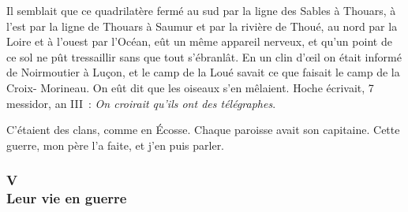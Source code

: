 \documentclass[french,twoside]{book} %
\begin{document}
Il semblait que ce quadrilatère fermé au sud par la ligne des Sables à Thouars, à l’est par la ligne de Thouars à Saumur et par la rivière de Thoué, au nord par la Loire et à l’ouest par l’Océan, eût un même appareil nerveux, et qu’un point de ce sol ne pût tressaillir sans que tout s’ébranlât. En un clin d’œil on était informé de Noirmoutier à Luçon, et le camp de la Loué savait ce que faisait le camp de la Croix- Morineau. On eût dit que les oiseaux s’en mêlaient. Hoche écrivait, 7 messidor, an III : \emph{On croirait qu’ils ont des télégraphes}.\par
C’étaient des clans, comme en Écosse. Chaque paroisse avait son capitaine. Cette guerre, mon père l’a faite, et j’en puis parler.
 \subsubsection[{V. Leur vie en guerre}]{V \\
Leur vie en guerre}
\label{p3l1c5}
\end{document}
